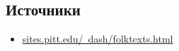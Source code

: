 \subsection*{Источники}

\begin{itemize}
    \item \href{https://sites.pitt.edu/~dash/folktexts.html}{sites.pitt.edu/~dash/folktexts.html}
\end{itemize}


